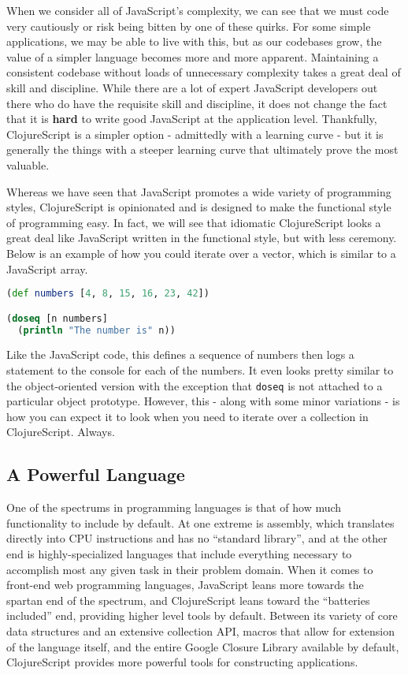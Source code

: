 \documentclass[10pt,twoside,openright]{memoir}
\begin{document}
When we consider all of JavaScript's complexity, we can see that we must
code very cautiously or risk being bitten by one of these quirks. For
some simple applications, we may be able to live with this, but as our
codebases grow, the value of a simpler language becomes more and more
apparent. Maintaining a consistent codebase without loads of unnecessary
complexity takes a great deal of skill and discipline. While there are a
lot of expert JavaScript developers out there who do have the requisite
skill and discipline, it does not change the fact that it is
\textbf{hard} to write good JavaScript at the application level.
Thankfully, ClojureScript is a simpler option - admittedly with a
learning curve - but it is generally the things with a steeper learning
curve that ultimately prove the most valuable.

Whereas we have seen that JavaScript promotes a wide variety of
programming styles, ClojureScript is opinionated and is designed to make
the functional style of programming easy. In fact, we will see that
idiomatic ClojureScript looks a great deal like JavaScript written in
the functional style, but with less ceremony. Below is an example of how
you could iterate over a vector, which is similar to a JavaScript array.

\begin{lstlisting}[language=Clojure, caption={Iterating over a vector in ClojureScript}]
(def numbers [4, 8, 15, 16, 23, 42])

(doseq [n numbers]
  (println "The number is" n))
\end{lstlisting}

Like the JavaScript code, this defines a sequence of numbers then logs a
statement to the console for each of the numbers. It even looks pretty
similar to the object-oriented version with the exception that
\texttt{doseq} is not attached to a particular object prototype.
However, this - along with some minor variations - is how you can expect
it to look when you need to iterate over a collection in ClojureScript.
Always.

\subsection{A Powerful Language}

One of the spectrums in programming languages is that of how much
functionality to include by default. At one extreme is assembly, which
translates directly into CPU instructions and has no ``standard
library'', and at the other end is highly-specialized languages that
include everything necessary to accomplish most any given task in their
problem domain. When it comes to front-end web programming languages,
JavaScript leans more towards the spartan end of the spectrum, and
ClojureScript leans toward the ``batteries included'' end, providing
higher level tools by default. Between its variety of core data
structures and an extensive collection API, macros that allow for
extension of the language itself, and the entire Google Closure Library
available by default, ClojureScript provides more powerful tools for
constructing applications.
\end{document}
